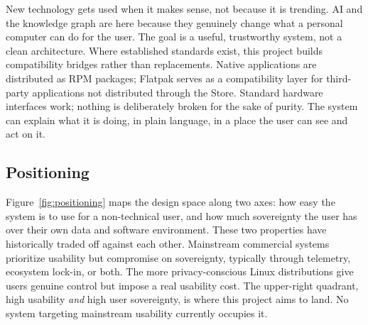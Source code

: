 New technology gets used when it makes sense, not because it is trending. AI
and the knowledge graph are here because they genuinely change what a personal
computer can do for the user. The goal is a useful, trustworthy system, not a
clean architecture. Where established standards exist, this project builds
compatibility bridges rather than replacements. Native applications are
distributed as RPM packages; Flatpak serves as a compatibility layer for
third-party applications not distributed through the Store. Standard hardware
interfaces work; nothing is deliberately broken for the sake of purity. The system can explain what it is doing, in
plain language, in a place the user can see and act on it.

\subsection{Positioning}
\label{sec:positioning}

Figure~\ref{fig:positioning} maps the design space along two axes: how easy
the system is to use for a non-technical user, and how much sovereignty the
user has over their own data and software environment. These two properties
have historically traded off against each other. Mainstream commercial systems
prioritize usability but compromise on sovereignty, typically through telemetry,
ecosystem lock-in, or both. The more privacy-conscious Linux distributions give
users genuine control but impose a real usability cost. The upper-right
quadrant, high usability \emph{and} high user sovereignty, is where this
project aims to land. No system targeting mainstream usability currently occupies it.

